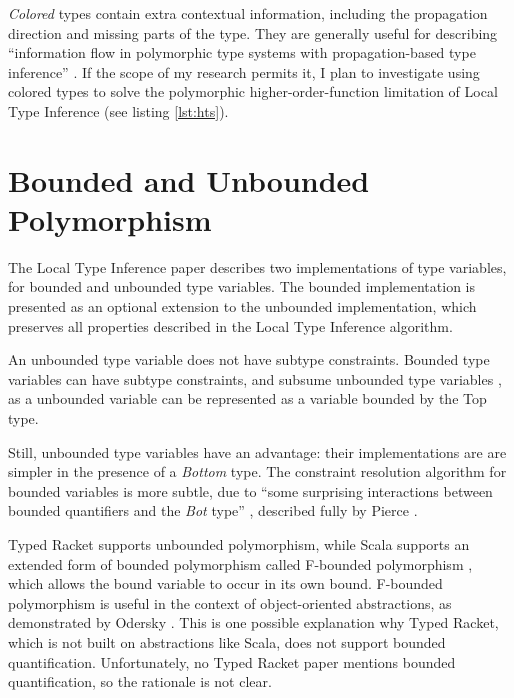 \documentclass[12pt, a4paper]{article}
\begin{document}
\emph{Colored} types contain extra contextual information, including the propagation direction
and missing parts of the type. They are generally useful
for describing ``information flow in polymorphic type systems with propagation-based type inference''
\cite{Odersky:2001:CLT:373243.360207}. If the scope of my research permits it, I plan to investigate
using colored types to solve the polymorphic higher-order-function limitation of Local Type Inference
(see listing \ref{lst:hts}).

\section{Bounded and Unbounded Polymorphism}

The Local Type Inference paper \cite{Pierce:2000:LTI:345099.345100}
describes two implementations of type variables, for bounded
and unbounded type variables. The bounded implementation is presented
as an optional extension  to the unbounded implementation, which preserves all
properties described in the Local Type Inference algorithm.

An unbounded type variable does not have subtype constraints.
Bounded type variables can have subtype constraints, and 
subsume unbounded type variables \cite{Pierce:2000:LTI:345099.345100}, 
as a unbounded variable can be represented as a variable bounded
by the Top type.

Still, unbounded type variables have an advantage: their implementations are
are simpler in the presence of a \emph{Bottom} type. 
The constraint resolution algorithm for bounded variables
is more subtle, due to ``some surprising interactions between bounded quantifiers
and the \emph{Bot} type'' \cite{Pierce:2000:LTI:345099.345100}, described fully
by Pierce \cite{Pierce97boundedquantification}.

Typed Racket \cite{Tobin-Hochstadt:2008:DIT:1328897.1328486}
supports unbounded polymorphism, while Scala \cite{Odersky06anoverview}
supports an extended form of bounded polymorphism called
F-bounded polymorphism \cite{Canning:1989:FPO:99370.99392}, which allows the
bound variable to occur in its own bound.
F-bounded polymorphism is useful in the context of object-oriented abstractions,
as demonstrated by Odersky \cite{Odersky06anoverview}.
This is one possible explanation why Typed Racket, which is not built on abstractions like Scala,
does not support bounded quantification. Unfortunately, no Typed Racket paper mentions 
bounded quantification, so the rationale is not clear.
\end{document}
